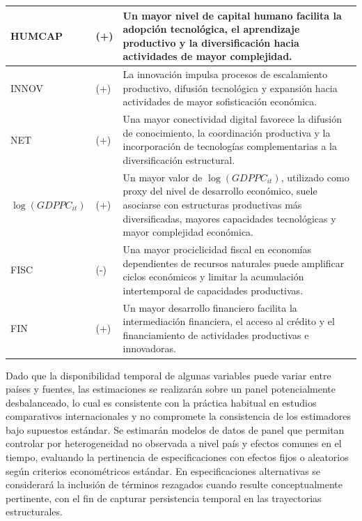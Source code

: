 \documentclass[../../PTFM.tex]{subfiles}
\begin{document}
\begin{longtable}{|
			>{\raggedright\arraybackslash}p{}|
			>{\centering\arraybackslash}p{}|
			>{\raggedright\arraybackslash}p{}|}
		HUMCAP
		& (+)
		& Un mayor nivel de capital humano facilita la adopción tecnológica, el aprendizaje productivo y la diversificación hacia actividades de mayor complejidad. \\
		\hline

		INNOV
		& (+)
		& La innovación impulsa procesos de escalamiento productivo, difusión tecnológica y expansión hacia actividades de mayor sofisticación económica. \\
		\hline

		NET
		& (+)
		& Una mayor conectividad digital favorece la difusión de conocimiento, la coordinación productiva y la incorporación de tecnologías complementarias a la diversificación estructural.
		\\
		\hline

		$\log(GDPPC_{it})$
		& (+)
		& Un mayor valor de $\log(GDPPC_{it})$, utilizado como proxy del nivel de desarrollo económico, suele asociarse con estructuras productivas más diversificadas, mayores capacidades tecnológicas y mayor complejidad económica. \\
		\hline

		FISC
		& (-)
		& Una mayor prociclicidad fiscal en economías dependientes de recursos naturales puede amplificar ciclos económicos y limitar la acumulación intertemporal de capacidades productivas. \\
		\hline

		FIN
		& (+)
		& Un mayor desarrollo financiero facilita la intermediación financiera, el acceso al crédito y el financiamiento de actividades productivas e innovadoras. \\
		\hline

	\end{longtable}


	Dado que la disponibilidad temporal de algunas variables puede variar entre países y fuentes, las estimaciones se realizarán sobre un panel potencialmente desbalanceado, lo cual es consistente con la práctica habitual en estudios comparativos internacionales y no compromete la consistencia de los estimadores bajo supuestos estándar. Se estimarán modelos de datos de panel que permitan controlar por heterogeneidad no observada a nivel país y efectos comunes en el tiempo, evaluando la pertinencia de especificaciones con efectos fijos o aleatorios según criterios econométricos estándar. En especificaciones alternativas se considerará la inclusión de términos rezagados cuando resulte conceptualmente pertinente, con el fin de capturar persistencia temporal en las trayectorias estructurales.
\end{document}
